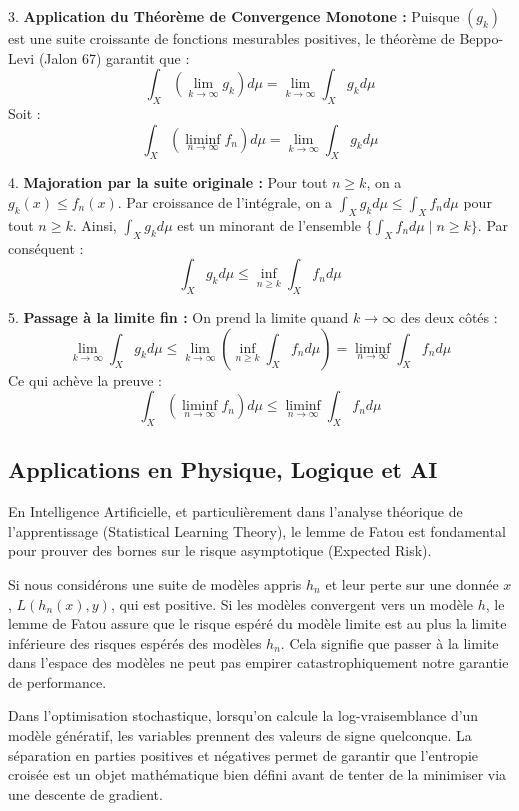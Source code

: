 \documentclass[11pt,a4paper]{article}
\begin{document}
3. \textbf{Application du Théorème de Convergence Monotone :}
   Puisque $(g_k)$ est une suite croissante de fonctions mesurables positives, le théorème de Beppo-Levi (Jalon 67) garantit que :
   $$ \int_X \left( \lim_{k \to \infty} g_k \right) d\mu = \lim_{k \to \infty} \int_X g_k d\mu $$
   Soit :
   $$ \int_X \left( \liminf_{n \to \infty} f_n \right) d\mu = \lim_{k \to \infty} \int_X g_k d\mu $$

4. \textbf{Majoration par la suite originale :}
   Pour tout $n \ge k$, on a $g_k(x) \le f_n(x)$.
   Par croissance de l'intégrale, on a $\int_X g_k d\mu \le \int_X f_n d\mu$ pour tout $n \ge k$.
   Ainsi, $\int_X g_k d\mu$ est un minorant de l'ensemble $\{ \int_X f_n d\mu \mid n \ge k \}$. Par conséquent :
   $$ \int_X g_k d\mu \le \inf_{n \ge k} \int_X f_n d\mu $$

5. \textbf{Passage à la limite fin :}
   On prend la limite quand $k \to \infty$ des deux côtés :
   $$ \lim_{k \to \infty} \int_X g_k d\mu \le \lim_{k \to \infty} \left( \inf_{n \ge k} \int_X f_n d\mu \right) = \liminf_{n \to \infty} \int_X f_n d\mu $$
   Ce qui achève la preuve :
   $$ \int_X \left( \liminf_{n \to \infty} f_n \right) d\mu \le \liminf_{n \to \infty} \int_X f_n d\mu $$

\subsection{Applications en Physique, Logique et AI}

En Intelligence Artificielle, et particulièrement dans l'analyse théorique de l'apprentissage (Statistical Learning Theory), le lemme de Fatou est fondamental pour prouver des bornes sur le risque asymptotique (Expected Risk).

Si nous considérons une suite de modèles appris $h_n$ et leur perte sur une donnée $x$, $L(h_n(x), y)$, qui est positive. Si les modèles convergent vers un modèle $h$, le lemme de Fatou assure que le risque espéré du modèle limite est au plus la limite inférieure des risques espérés des modèles $h_n$. Cela signifie que passer à la limite dans l'espace des modèles ne peut pas empirer catastrophiquement notre garantie de performance.

Dans l'optimisation stochastique, lorsqu'on calcule la log-vraisemblance d'un modèle génératif, les variables prennent des valeurs de signe quelconque. La séparation en parties positives et négatives permet de garantir que l'entropie croisée est un objet mathématique bien défini avant de tenter de la minimiser via une descente de gradient.
\end{document}
